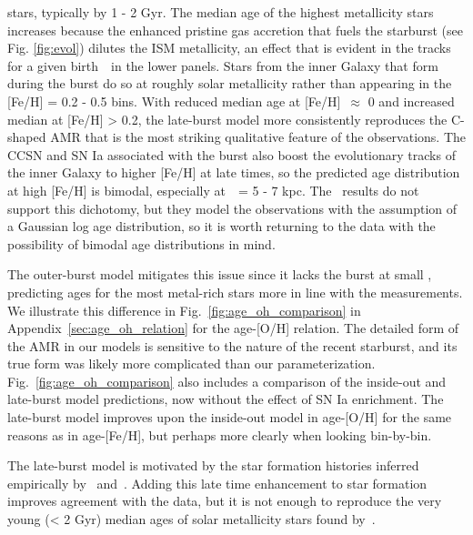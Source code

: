 \documentclass[draft2.tex]{subfiles}
\begin{document}
stars, typically by 1 - 2 Gyr. 
The median age of the highest metallicity stars increases because the 
enhanced pristine gas accretion that fuels the starburst (see Fig. 
\ref{fig:evol}) dilutes the ISM metallicity, an effect that is evident in the 
tracks for a given birth~\rgal~in the lower panels. 
Stars from the inner Galaxy that form during the burst do so at roughly solar 
metallicity rather than appearing in the [Fe/H] = 0.2 - 0.5 bins. 
With reduced median age at [Fe/H]~$\approx$ 0 and increased median at 
[Fe/H] > 0.2, the late-burst model more consistently reproduces the C-shaped 
AMR that is the most striking qualitative feature of the observations. 
The CCSN and SN Ia associated with the burst also boost the evolutionary 
tracks of the inner Galaxy to higher [Fe/H] at late times, so the predicted 
age distribution at high [Fe/H] is bimodal, especially at~\rgal~= 5 - 7 kpc. 
The~\citet{Feuillet2019} results do not support this dichotomy, but they 
model the observations with the assumption of a Gaussian log age distribution, 
so it is worth returning to the data with the possibility of bimodal age 
distributions in mind. 
\par 
The outer-burst model mitigates this issue since it lacks the burst at small 
\rgal, predicting ages for the most metal-rich stars more in line with the 
\citet{Feuillet2019} measurements. 
We illustrate this difference in Fig.~\ref{fig:age_oh_comparison} in 
Appendix~\ref{sec:age_oh_relation} for the age-[O/H] relation. 
The detailed form of the AMR in our models is sensitive to the nature of the 
recent starburst, and its true form was likely more complicated than our 
parameterization. 
Fig.~\ref{fig:age_oh_comparison} also includes a comparison of the inside-out 
and late-burst model predictions, now without the effect of SN Ia enrichment. 
The late-burst model improves upon the inside-out model in age-[O/H] for the 
same reasons as in age-[Fe/H], but perhaps more clearly when looking 
bin-by-bin. 
\par 
The late-burst model is motivated by the star formation histories inferred 
empirically by~\citet{Isern2019} and~\citet{Mor2019}. 
Adding this late time enhancement to star formation improves agreement with the 
\citet{Feuillet2019} data, but it is not enough to reproduce the very young 
(< 2 Gyr) median ages of solar metallicity stars found by~\citet{Feuillet2018}. 
\end{document}
